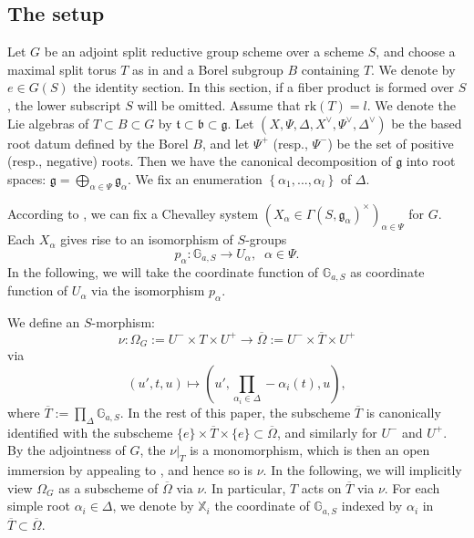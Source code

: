\documentclass[11pt, reqno]{amsart}
\theoremstyle{plain}
\theoremstyle{definition}
\begin{document}
\subsection{The setup}
Let $G$ be an adjoint split reductive group scheme over a scheme $S$, and choose a maximal split torus $T$ as in \cite[exposé~XXII, définition~1.13]{SGA3III} and a Borel subgroup $B$ containing $T$. We denote by $e\in G(S)$ the identity section. In this section, if a fiber product is formed over $S$, the lower subscript $S$ will be omitted. Assume that $\text{rk}(T)=l$. We denote the Lie algebras of $T\subset B\subset G$ by $\mathfrak{t}\subset \mathfrak{b}\subset \mathfrak{g}$. Let $(X,\Psi, \Delta, X^{\vee}, \Psi^{\vee}, \Delta^{\vee})$ be the based root datum defined by the Borel $B$, and let $\Psi^+$ (resp., $\Psi^-$) be the set of positive (resp., negative) roots. Then we have the canonical decomposition of $\mathfrak{g}$ into root spaces: $\mathfrak{g}=\bigoplus_{\alpha\in\Psi}\mathfrak{g}_{\alpha}$. We fix an enumeration $\left\{\alpha_1,...,\alpha_l\right\}$ of $\Delta$.

According to \cite[exposé~XXIII, proposition~6.2]{SGA3III}, we can fix a Chevalley system $(X_\alpha\in \Gamma(S,\mathfrak{g}_{\alpha})^{\times})_{\alpha\in\Psi}$ for $G$. Each $X_\alpha$ gives rise to an isomorphism of $S$-groups $$p_\alpha\colon\mathbb{G}_{a,S}\longrightarrow U_\alpha,\;\;\alpha\in\Psi.$$ 
In the following, we will take the coordinate function of $\mathbb{G}_{a,S}$ as coordinate function of $U_{\alpha}$ via the isomorphism $p_{\alpha}$.

We define an $S$-morphism:
\begin{equation}\label{Omegaembedformula}
    \nu\colon\Omega_G:=U^-\times T\times U^+\longrightarrow \overline{\Omega}:=U^-\times \overline{T}\times U^+
\end{equation}
via
$$(u',t,u)\mapsto (u',\prod_{\alpha_i\in \Delta}-\alpha_i(t), u),$$
where $\overline{T}:=\prod_{\Delta}\mathbb{G}_{a,S}.$ In the rest of this paper, the subscheme $\overline{T}$ is canonically identified with the subscheme $\{e\}\times\overline{T}\times\{e\}\subset\overline{\Omega}$, and similarly for $U^-$ and $U^+$.
By the adjointness of $G$, the $\nu\vert_{T}$ is a monomorphism, which is then an open immersion by appealing to \cite[\S~5.3]{oesterlemultiplicatifgroup}, and hence so is $\nu$. In the following, we will implicitly view $\Omega_G$ as a subscheme of $\overline{\Omega}$ via $\nu$. In particular, $T$ acts on $\overline{T}$ via $\nu$. For each simple root $\alpha_i\in \Delta$, we denote by $\mathbb{X}_i$ the coordinate of $\mathbb{G}_{a,S}$ indexed by $\alpha_i$ in $\overline{T}\subset\overline{\Omega}$.
\end{document}
